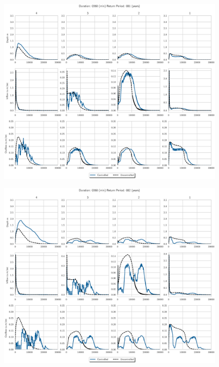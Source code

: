 \begin{figure}
    \centering
    \includegraphics[width=\linewidth]{./RL-SI-figures/77storms/0360001.eps}
\end{figure}
\begin{figure}
    \centering
    \includegraphics[width=\linewidth]{./RL-SI-figures/77storms/0360002.eps}
\end{figure}
